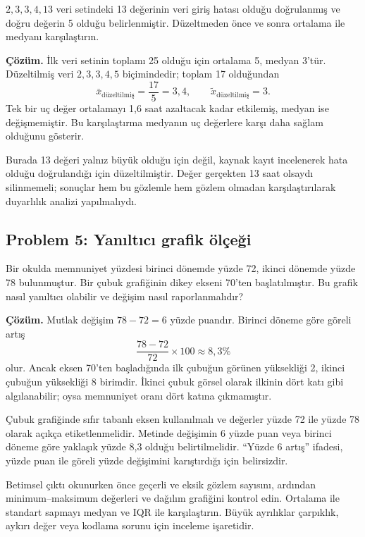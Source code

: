 $2,3,3,4,13$ veri setindeki 13 değerinin veri giriş hatası olduğu doğrulanmış
ve doğru değerin 5 olduğu belirlenmiştir. Düzeltmeden önce ve sonra ortalama
ile medyanı karşılaştırın.

\textbf{Çözüm.} İlk veri setinin toplamı 25 olduğu için ortalama 5, medyan
3'tür. Düzeltilmiş veri $2,3,3,4,5$ biçimindedir; toplam 17 olduğundan
\[
\bar{x}_{\text{düzeltilmiş}}=\frac{17}{5}=3{,}4,
\qquad \widetilde{x}_{\text{düzeltilmiş}}=3.
\]
Tek bir uç değer ortalamayı 1,6 saat azaltacak kadar etkilemiş, medyan ise
değişmemiştir. Bu karşılaştırma medyanın uç değerlere karşı daha sağlam
olduğunu gösterir.

Burada 13 değeri yalnız büyük olduğu için değil, kaynak kayıt incelenerek hata
olduğu doğrulandığı için düzeltilmiştir. Değer gerçekten 13 saat olsaydı
silinmemeli; sonuçlar hem bu gözlemle hem gözlem olmadan karşılaştırılarak
duyarlılık analizi yapılmalıydı.

\subsection*{Problem 5: Yanıltıcı grafik ölçeği}

Bir okulda memnuniyet yüzdesi birinci dönemde yüzde 72, ikinci dönemde yüzde
78 bulunmuştur. Bir çubuk grafiğinin dikey ekseni 70'ten başlatılmıştır. Bu
grafik nasıl yanıltıcı olabilir ve değişim nasıl raporlanmalıdır?

\textbf{Çözüm.} Mutlak değişim $78-72=6$ yüzde puandır. Birinci döneme göre
göreli artış
\[
\frac{78-72}{72}\times100\approx8{,}3\%
\]
olur. Ancak eksen 70'ten başladığında ilk çubuğun görünen yüksekliği 2, ikinci
çubuğun yüksekliği 8 birimdir. İkinci çubuk görsel olarak ilkinin dört katı
gibi algılanabilir; oysa memnuniyet oranı dört katına çıkmamıştır.

Çubuk grafiğinde sıfır tabanlı eksen kullanılmalı ve değerler yüzde 72 ile
yüzde 78 olarak açıkça etiketlenmelidir. Metinde değişimin 6 yüzde puan veya
birinci döneme göre yaklaşık yüzde 8,3 olduğu belirtilmelidir. ``Yüzde 6
artış'' ifadesi, yüzde puan ile göreli yüzde değişimini karıştırdığı için
belirsizdir.

\begin{outputguidebox}
Betimsel çıktı okunurken önce geçerli ve eksik gözlem sayısını, ardından
minimum--maksimum değerleri ve dağılım grafiğini kontrol edin. Ortalama ile
standart sapmayı medyan ve IQR ile karşılaştırın. Büyük ayrılıklar çarpıklık,
aykırı değer veya kodlama sorunu için inceleme işaretidir.
\end{outputguidebox}

